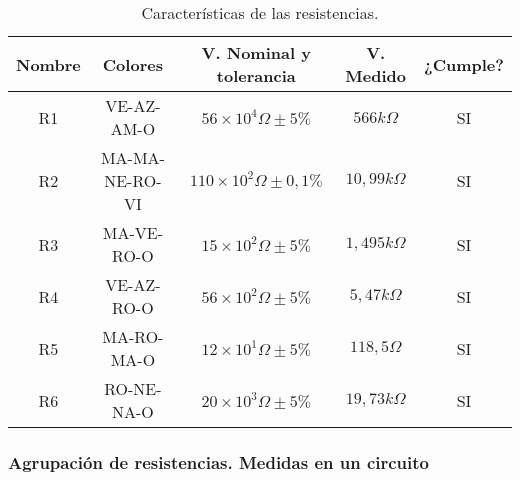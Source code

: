 \begin{table}[!hbt]
	\label{tablaejemplo}
	\begin{center}
		\begin{tabular}{|c|c|c|c|c|}
			\hline
			\textbf{Nombre} & \textbf{Colores} & \textbf{V. Nominal y tolerancia} & \textbf{V. Medido} & \textbf{¿Cumple?} \\
			\hline
			R1 & VE-AZ-AM-O 	& $ 56 \times 10^{4} \Omega \pm 5\% $ & $ 566 k\Omega $ & SI \\
			R2 & MA-MA-NE-RO-VI & $ 110 \times 10^{2} \Omega \pm 0,1\% $ & $ 10,99 k\Omega $ 	& SI \\
			R3 & MA-VE-RO-O 	& $ 15 \times 10^{2} \Omega \pm 5\% $ & $ 1,495 k\Omega $ & SI \\
			R4 & VE-AZ-RO-O 	& $ 56 \times 10^{2} \Omega \pm 5\% $ & $ 5,47 k\Omega $ & SI \\
			R5 & MA-RO-MA-O 	& $ 12 \times 10^{1} \Omega \pm 5\% $ & $ 118,5 \Omega $ & SI \\
			R6 & RO-NE-NA-O 	& $ 20 \times 10^{3} \Omega \pm 5\% $ & $ 19,73 k\Omega $ & SI \\
			\hline
		\end{tabular}
		\caption[Tabla de Ejemplo]{Características de las resistencias.}
	\end{center}
\end{table}

\subsubsection{Agrupación de resistencias. Medidas en un circuito}

